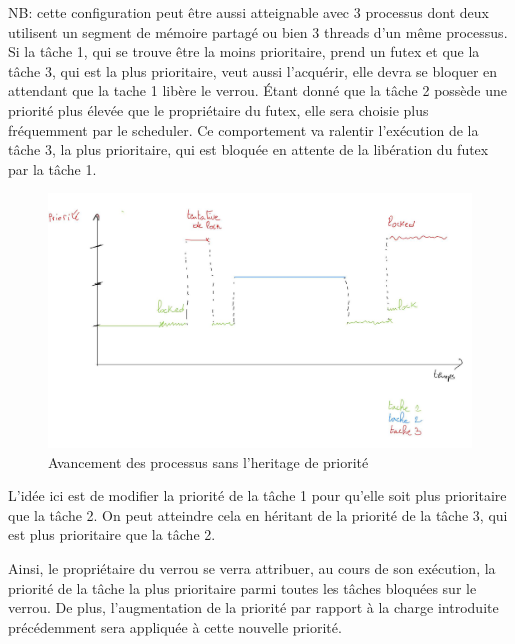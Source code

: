NB: cette configuration peut être aussi atteignable avec 3 processus dont deux 
utilisent un segment de mémoire partagé ou bien 3 threads d'un même processus.
\\

Si la tâche 1, qui se trouve être la moins prioritaire, prend un futex et que 
la tâche 3, qui est la plus prioritaire, veut aussi l'acquérir, elle
devra se bloquer en attendant que la tache 1 libère le verrou. Étant donné que la tâche 2 possède une priorité plus élevée que le propriétaire du futex, elle sera choisie plus fréquemment par le scheduler. Ce comportement va ralentir l'exécution de la tâche 3, la plus prioritaire, qui est bloquée en attente de la libération du futex par la tâche 1.

\begin{figure}[h!]
	\centering
	\includegraphics[scale=0.21]{include/without_inherit.jpg}
	\caption{Avancement des processus sans l'heritage de priorité}
	\label{fig:without_inherit}
\end{figure}

\newpage


L'idée ici est de modifier la priorité de la tâche 1 pour qu'elle soit plus 
prioritaire que la tâche 2. On peut atteindre cela en héritant de la 
priorité de la tâche 3, qui est plus prioritaire que la tâche 2. 

Ainsi, le propriétaire du verrou se verra attribuer, au cours de son exécution, la priorité de la tâche la plus prioritaire parmi toutes les tâches bloquées sur le verrou. De plus, l'augmentation de la priorité par rapport à la charge introduite précédemment sera appliquée à cette nouvelle priorité.

